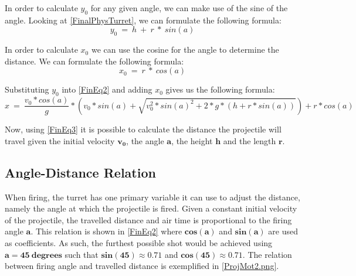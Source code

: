 In order to calculate $y_0$ for any given angle, we can make use of the sine of
the angle. Looking at \autoref{FinalPhysTurret}, we can formulate the following
formula:
\begin{equation}\label{Y0Eq}
y_0\ =\ h\ +\ r\ *\ sin(a)
\end{equation}

In order to calculate $x_0$ we can use the cosine for the angle to determine the
distance. We can formulate the following formula:
\begin{equation}\label{Y0Eq}
x_0\ =\ r\ *\ cos(a)
\end{equation}

Substituting $y_0$ into \autoref{FinEq2} and adding $x_0$ gives
us the following formula:
\begin{equation}\label{FinEq3}
x\ =\ \frac{v_0*cos(a)}{g}* \left(
v_0*sin(a)+\sqrt{v_0^2*sin(a)^2+2*g*(h+r*sin(a))}\right)+r*cos(a)
\end{equation}

Now, using \autoref{FinEq3} it is possible to calculate the
distance the projectile will travel given the initial velocity $\mathbf{v_0}$,
the angle $\mathbf{a}$, the height $\mathbf{h}$ and the length $\mathbf{r}$.

\subsection{Angle-Distance Relation}
When firing, the turret has one primary variable it can use to adjust the
distance, namely the angle at which the projectile is fired. Given a constant
initial velocity of the projectile, the travelled distance and air time is proportional
to the firing angle $\mathbf{a}$. This relation is shown in \autoref{FinEq2}
where $\mathbf{cos(a)}$ and $\mathbf{sin(a)}$ are used as coefficients. As
such, the furthest possible shot would be achieved using $\mathbf{a=45\
degrees}$ such that $\mathbf{sin(45)\approx 0.71}$ and $\mathbf{cos(45)\approx
0.71}$. The relation between firing angle and travelled distance is exemplified
in \autoref{ProjMot2.png}.




